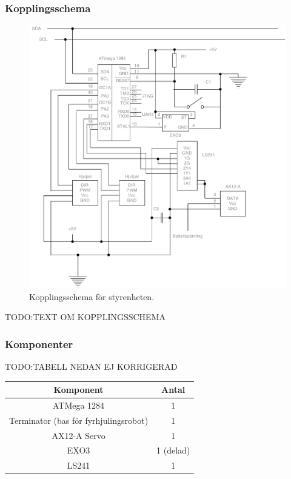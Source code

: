 \documentclass{article}
\begin{document}
\subsubsection{Kopplingsschema}
\begin{figure}[H]
\centering
\includegraphics[scale=0.45]{Styrenhet_kopplingsschema}
\caption{Kopplingsschema för styrenheten.}
\label{fig:styrenhet_kopplingsschema}
\end{figure}

TODO:TEXT OM KOPPLINGSSCHEMA

\subsubsection{Komponenter}
TODO:TABELL NEDAN EJ KORRIGERAD
\begin{table}[H]
  \centering
  \begin{tabular}{ | c | c |}
    \hline
    \textbf{Komponent} & \textbf{Antal} \\
    \hline
    ATMega 1284 & 1 \\
    \hline
    Terminator (bas för fyrhjulingsrobot) & 1 \\
    \hline
    AX12-A Servo & 1 \\
    \hline
    EXO3 & 1 (delad) \\
    \hline
    LS241 & 1 \\
    \hline
  \end{tabular}
\end{table}
\end{document}
